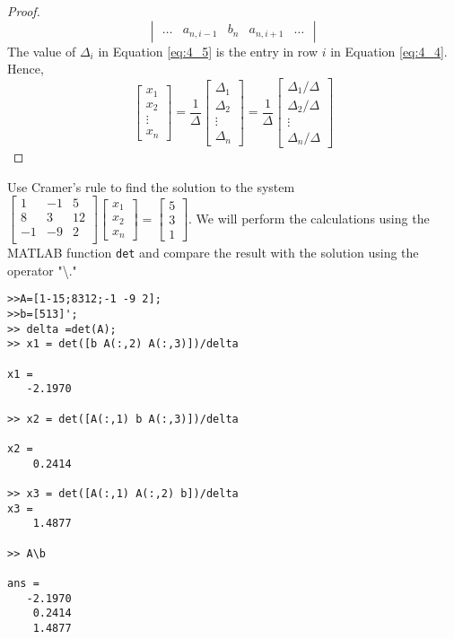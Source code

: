 \documentclass[../main.tex]{subfiles}
\begin{document}
\begin{proof}
\begin{equation}
\begin{vmatrix}
      \ldots & a_{n, i-1} & b_n & a_{n,i+1} & \ldots
    \end{vmatrix}
  \end{equation}
  The value of \(\Delta_i\) in Equation \ref{eq:4_5} is the entry in row \(i\) in Equation \ref{eq:4_4}. Hence,
  \begin{equation*}
    \begin{bmatrix}
      x_1 \\ x_2 \\ \vdots \\ x_n
    \end{bmatrix}
    =\frac{1}{\Delta}\begin{bmatrix}
      \Delta_1 \\ \Delta_2 \\ \vdots \\ \Delta_n
    \end{bmatrix}
    =\frac{1}{\Delta}\begin{bmatrix}
      \Delta_1/\Delta \\ \Delta_2/\Delta \\ \vdots \\ \Delta_n/\Delta
    \end{bmatrix}
  \end{equation*}
\end{proof}

\begin{example} \label{ex:4_17}
  Use Cramer's rule to find the solution to the system \(\begin{bmatrix}
    1 & -1 & 5\\
    8 & 3 & 12\\
    -1 & -9 & 2\\
  \end{bmatrix}
  \begin{bmatrix}
    x_1 \\ x_2 \\ x_n
  \end{bmatrix}
  =\begin{bmatrix}
  5 \\ 3 \\ 1
  \end{bmatrix}
  \). We will perform the calculations using the MATLAB function \texttt{det} and compare the result with the solution using the operator "\textbackslash."
  \begin{lstlisting}[numbers=none,frame=none]
>>A=[1-15;8312;-1 -9 2];
>>b=[513]';
>> delta =det(A);
>> x1 = det([b A(:,2) A(:,3)])/delta

x1 =
   -2.1970

>> x2 = det([A(:,1) b A(:,3)])/delta

x2 =
    0.2414

>> x3 = det([A(:,1) A(:,2) b])/delta
x3 =
    1.4877

>> A\b

ans =
   -2.1970
    0.2414
    1.4877
  \end{lstlisting}
\end{example}
\end{document}
